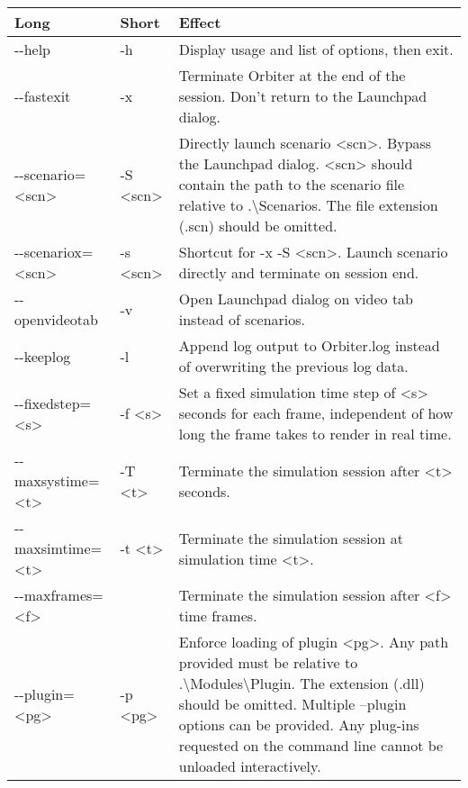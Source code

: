 \documentclass[Orbiter User Manual.tex]{subfiles}
\begin{document}
	\begin{longtable}{ |p{}|p{}|p{}| }
	\hline\rule{0pt}{2ex}
	\textbf{Long} & \textbf{Short} & \textbf{Effect}\\
	\hline\rule{0pt}{2ex}
	-{}-help & -h & Display usage and list of options, then exit.\\
	\hline\rule{0pt}{2ex}
	-{}-fastexit & -x & Terminate Orbiter at the end of the session. Don’t return to the Launchpad dialog.\\
	\hline\rule{0pt}{2ex}
	-{}-scenario=<scn> & -S <scn> & Directly launch scenario <scn>. Bypass the Launchpad dialog. <scn> should contain the path to the scenario file relative to .\textbackslash Scenarios. The file extension (.scn) should be omitted.\\
	\hline\rule{0pt}{2ex}
	-{}-scenariox=<scn> & -s <scn> & Shortcut for -x -S <scn>. Launch scenario directly and terminate on session end.\\
	\hline\rule{0pt}{2ex}
	-{}-openvideotab & -v & Open Launchpad dialog on video tab instead of scenarios.\\
	\hline\rule{0pt}{2ex}
	-{}-keeplog & -l & Append log output to Orbiter.log instead of overwriting the previous log data.\\
	\hline\rule{0pt}{2ex}
	-{}-fixedstep=<s> & -f <s> & Set a fixed simulation time step of <s> seconds for each frame, independent of how long the frame takes to render in real time.\\
	\hline\rule{0pt}{2ex}
	-{}-maxsystime=<t> & -T <t> & Terminate the simulation session after <t> seconds.\\
	\hline\rule{0pt}{2ex}
	-{}-maxsimtime=<t> & -t <t> & Terminate the simulation session at simulation time <t>.\\
	\hline\rule{0pt}{2ex}
	-{}-maxframes=<f> & & Terminate the simulation session after <f> time frames.\\
	\hline\rule{0pt}{2ex}
	-{}-plugin=<pg> & -p <pg> & Enforce loading of plugin <pg>. Any path provided must be relative to .\textbackslash Modules\textbackslash Plugin. The extension (.dll) should be omitted. Multiple –plugin options can be provided. Any plug-ins requested on the command line cannot be unloaded interactively.\\
	\hline
	\end{longtable}
\end{document}
